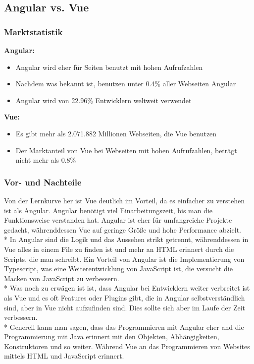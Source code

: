 \subsection{Angular vs. Vue}
\subsubsection{Marktstatistik}
\textbf{Angular:}
\begin{itemize}
    \item Angular wird eher für Seiten benutzt mit hohen Aufrufzahlen \cite{AngularUsage}
    \item Nachdem was bekannt ist, benutzen unter 0.4\% aller Webseiten Angular \cite{UsageJSLibs}   
    \item Angular wird von 22.96\% Entwicklern weltweit verwendet \cite{AngVsVueSIM}
\end{itemize}

\textbf{Vue:}
\begin{itemize}
    \item Es gibt mehr als 2.071.882 Millionen Webseiten, die Vue benutzen
    \item Der Marktanteil von Vue bei Webseiten mit hohen Aufrufzahlen, beträgt nicht mehr als 0.8\% \cite{AngVsVueSIM}       
\end{itemize}
\subsubsection{Vor- und Nachteile}
Von der Lernkurve her ist Vue deutlich im Vorteil, da es einfacher zu verstehen ist als Angular. Angular benötigt viel Einarbeitungszeit, bis man die Funktionsweise
verstanden hat. Angular ist eher für umfangreiche Projekte gedacht, währenddessen Vue auf geringe Größe und hohe Performance abzielt. \\*
In Angular sind die Logik und das Aussehen strikt getrennt, währenddessen in Vue alles in einem File zu finden ist und mehr an HTML erinnert durch die Scripts, die man schreibt.
Ein Vorteil von Angular ist die Implementierung von Typescript, was eine Weiterentwicklung von JavaScript ist, die versucht die Macken von JavaScript zu verbessern.\\* 
Was noch zu erwägen ist ist, dass Angular bei Entwicklern weiter verbreitet ist als Vue und es oft Features oder Plugins gibt, die in Angular selbstverständlich sind, aber in Vue nicht aufzufinden sind.
Dies sollte sich aber im Laufe der Zeit verbessern. \\*  Generell kann man sagen, dass das Programmieren mit Angular eher and die Programmierung mit Java erinnert mit den Objekten, Abhängigkeiten,
Konstruktoren und so weiter. Während Vue an das Programmieren von Websites mittels HTML und JavaScript erinnert. \cite{AngVsVueHOST}
